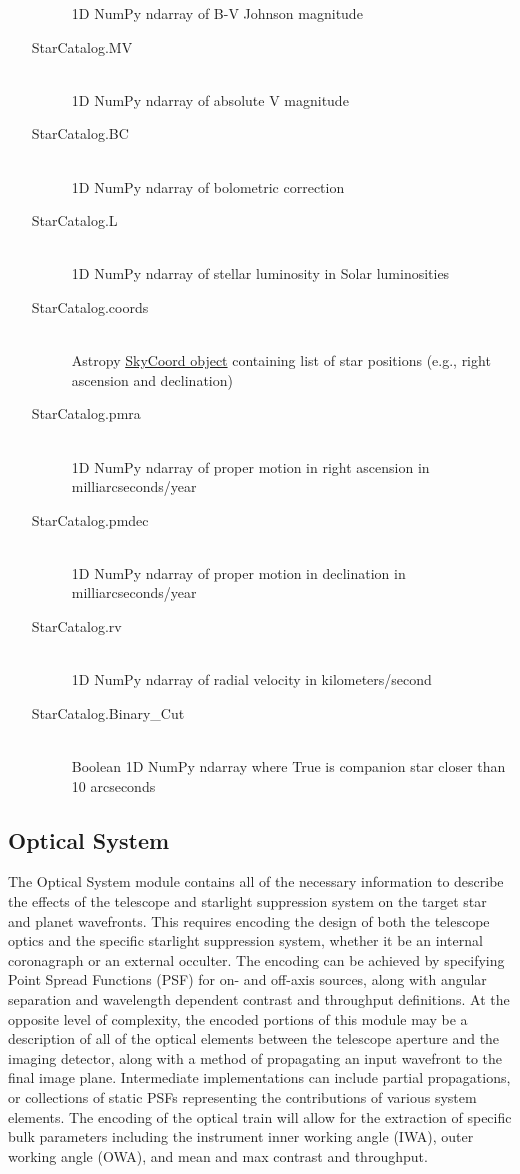 \documentclass[cleanfoot]{asme2ej}
\begin{document}
\begin{itemize}
\begin{description}
        1D NumPy ndarray of B-V Johnson magnitude
        \item[StarCatalog.MV] \hfill \\
        1D NumPy ndarray of absolute V magnitude
        \item[StarCatalog.BC] \hfill \\
        1D NumPy ndarray of bolometric correction
        \item[StarCatalog.L] \hfill \\
        1D NumPy ndarray of stellar luminosity in Solar luminosities
        \item[StarCatalog.coords] \hfill \\
        Astropy \href{http://astropy.readthedocs.org/en/latest/api/astropy.coordinates.SkyCoord.html}{SkyCoord object} containing list of star positions (e.g., right ascension and declination)
        \item[StarCatalog.pmra] \hfill \\
        1D NumPy ndarray of proper motion in right ascension in milliarcseconds/year
        \item[StarCatalog.pmdec] \hfill \\
        1D NumPy ndarray of proper motion in declination in milliarcseconds/year
        \item[StarCatalog.rv] \hfill \\
        1D NumPy ndarray of radial velocity in kilometers/second
        \item[StarCatalog.Binary\_Cut] \hfill \\
        Boolean 1D NumPy ndarray where True is companion star closer than 10 arcseconds
    \end{description}
\end{itemize}


\subsection{Optical System}
The Optical System module contains all of the necessary information to describe the effects of the telescope and starlight suppression system on the target star and planet wavefronts.  This requires encoding the design of both the telescope optics and the specific starlight suppression system, whether it be an internal coronagraph or an external occulter.  The encoding can be achieved by specifying Point Spread Functions (PSF) for on- and off-axis sources, along with angular separation and wavelength dependent contrast and throughput definitions.  At the opposite level of complexity, the encoded portions of this module may be a description of all of the optical elements between the telescope aperture and the imaging detector, along with a method of propagating an input wavefront to the final image plane.  Intermediate implementations can include partial propagations, or collections of static PSFs representing the contributions of various system elements.  The encoding of the optical train will allow for the extraction of specific bulk parameters including the instrument inner working angle (IWA), outer working angle (OWA), and mean and max contrast and throughput.
\end{document}
